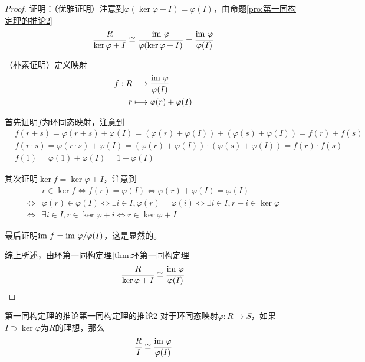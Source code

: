 \begin{proof}
	
	证明：（优雅证明）注意到$\varphi(\ker\varphi+I)=\varphi(I)$，由命题\ref{pro:第一同构定理的推论2}
	$$
	\frac{R}{\ker\varphi+I}\cong\frac{\text{im } \varphi}{\varphi(\ker\varphi+I)}=\frac{\text{im } \varphi}{\varphi(I)}
	$$
	
	（朴素证明）定义映射
	\begin{align*}
		f:\begin{aligned}[t]
			R&\longrightarrow \frac{\text{im } \varphi}{\varphi(I)}\\
			r&\longmapsto \varphi(r)+\varphi(I)
		\end{aligned}
	\end{align*}
	
	首先证明$f$为环同态映射，注意到
	\begin{align*}
		&f(r+s)=\varphi(r+s)+\varphi(I)=(\varphi(r)+\varphi(I))+(\varphi(s)+\varphi(I))=f(r)+f(s)\\
		&f(r\cdot s)=\varphi(r\cdot s)+\varphi(I)=(\varphi(r)+\varphi(I))\cdot(\varphi(s)+\varphi(I))=f(r)\cdot f(s)\\
		&f(1)=\varphi(1)+\varphi(I)=1+\varphi(I)
	\end{align*}
	
	其次证明$\ker f=\ker\varphi+I$，注意到
	\begin{align*}
		&r\in\ker f
		\iff f(r)=\varphi(I)
		\iff \varphi(r)+\varphi(I)=\varphi(I)\\
		\iff &\varphi(r)\in\varphi(I)
		\iff \exists i\in I,\varphi(r)=\varphi(i)
		\iff \exists i\in I,r-i\in\ker\varphi\\
		\iff&\exists i\in I,r\in\ker\varphi+i
		\iff r\in\ker\varphi+I
	\end{align*}
	
	最后证明$\text{im } f=\text{im } \varphi/\varphi(I)$，这是显然的。
	
	综上所述，由环第一同构定理\ref{thm:环第一同构定理}
	$$
	\frac{R}{\ker\varphi+I}\cong\frac{\text{im } \varphi}{\varphi(I)}
	$$
\end{proof}

\begin{proposition}{第一同构定理的推论}{第一同构定理的推论2}
	对于环同态映射$\varphi:R\to S$，如果$I\supset\ker\varphi$为$R$的理想，那么
	$$
	\frac{R}{I}\cong\frac{\text{im } \varphi}{\varphi(I)}
	$$
\end{proposition}

